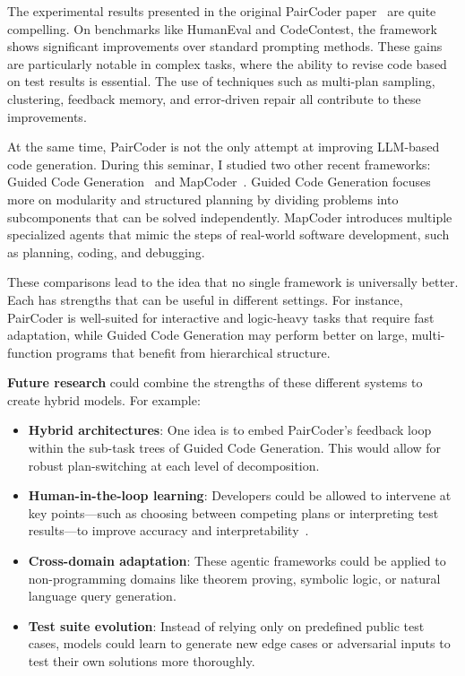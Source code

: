 \documentclass[11pt,a4paper]{article}
\begin{document}
The experimental results presented in the original PairCoder paper~\cite{zhang2024paircoder} are quite compelling. On benchmarks like HumanEval and CodeContest, the framework shows significant improvements over standard prompting methods. These gains are particularly notable in complex tasks, where the ability to revise code based on test results is essential. The use of techniques such as multi-plan sampling, clustering, feedback memory, and error-driven repair all contribute to these improvements.

At the same time, PairCoder is not the only attempt at improving LLM-based code generation. During this seminar, I studied two other recent frameworks: Guided Code Generation~\cite{almorsi2025guided} and MapCoder~\cite{islam2024mapcodermultiagentcodegeneration}. Guided Code Generation focuses more on modularity and structured planning by dividing problems into subcomponents that can be solved independently. MapCoder introduces multiple specialized agents that mimic the steps of real-world software development, such as planning, coding, and debugging.

These comparisons lead to the idea that no single framework is universally better. Each has strengths that can be useful in different settings. For instance, PairCoder is well-suited for interactive and logic-heavy tasks that require fast adaptation, while Guided Code Generation may perform better on large, multi-function programs that benefit from hierarchical structure.

\textbf{Future research} could combine the strengths of these different systems to create hybrid models. For example:
\begin{itemize}
  \item \textbf{Hybrid architectures}: One idea is to embed PairCoder’s feedback loop within the sub-task trees of Guided Code Generation. This would allow for robust plan-switching at each level of decomposition.
  \item \textbf{Human-in-the-loop learning}: Developers could be allowed to intervene at key points—such as choosing between competing plans or interpreting test results—to improve accuracy and interpretability~\cite{chen2024selfdebugging}.
  \item \textbf{Cross-domain adaptation}: These agentic frameworks could be applied to non-programming domains like theorem proving, symbolic logic, or natural language query generation.
  \item \textbf{Test suite evolution}: Instead of relying only on predefined public test cases, models could learn to generate new edge cases or adversarial inputs to test their own solutions more thoroughly.
\end{itemize}
\end{document}
